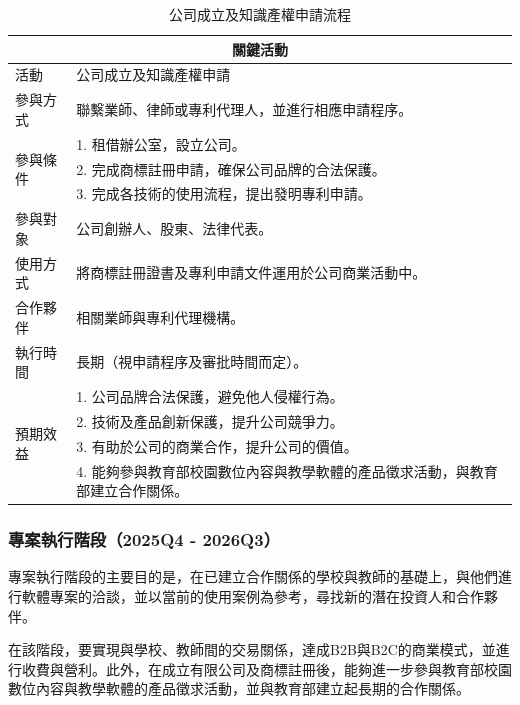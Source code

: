 \begin{table}[H]
  \centering
  \caption{公司成立及知識產權申請流程}
  \begin{tabular}{|l|l|}
      \hline
      \multicolumn{2}{|c|}{\textbf{關鍵活動}} \\ \hline
      活動 & 公司成立及知識產權申請 \\ \hline
      參與方式 & 聯繫業師、律師或專利代理人，並進行相應申請程序。 \\ \hline
      \multirow{3}{*}{參與條件}
      & 1. 租借辦公室，設立公司。 \\
      & 2. 完成商標註冊申請，確保公司品牌的合法保護。 \\
      & 3. 完成各技術的使用流程，提出發明專利申請。 \\ \hline
      參與對象 & 公司創辦人、股東、法律代表。 \\ \hline
      使用方式 & 將商標註冊證書及專利申請文件運用於公司商業活動中。 \\ \hline
      合作夥伴 & 相關業師與專利代理機構。 \\ \hline
      執行時間 & 長期（視申請程序及審批時間而定）。 \\ \hline
      \multirow{4}{*}{預期效益}
      & 1. 公司品牌合法保護，避免他人侵權行為。 \\
      & 2. 技術及產品創新保護，提升公司競爭力。 \\
      & 3. 有助於公司的商業合作，提升公司的價值。 \\ 
      & 4. 能夠參與教育部校園數位內容與教學軟體的產品徵求活動，與教育部建立合作關係。 \\ \hline
  \end{tabular}
\end{table}

\subsubsection{專案執行階段（2025Q4 - 2026Q3）}

專案執行階段的主要目的是，在已建立合作關係的學校與教師的基礎上，與他們進行軟體專案的洽談，並以當前的使用案例為參考，尋找新的潛在投資人和合作夥伴。

在該階段，要實現與學校、教師間的交易關係，達成B2B與B2C的商業模式，並進行收費與營利。此外，在成立有限公司及商標註冊後，能夠進一步參與教育部校園數位內容與教學軟體的產品徵求活動，並與教育部建立起長期的合作關係。

